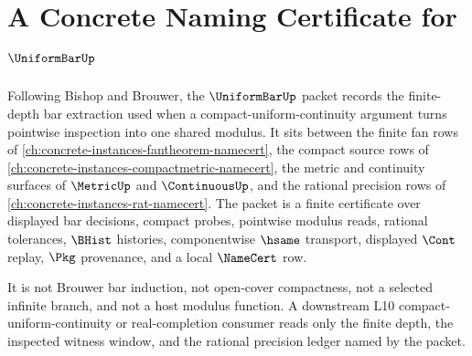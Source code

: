 \chapter{A Concrete Naming Certificate for $\UniformBarUp$}
\label{ch:concrete-instances-uniform-bar-namecert}

Following Bishop and Brouwer, the $\UniformBarUp$ packet records the finite-depth bar extraction used when a compact-uniform-continuity argument turns pointwise inspection into one shared modulus. It sits between the finite fan rows of \autoref{ch:concrete-instances-fantheorem-namecert}, the compact source rows of \autoref{ch:concrete-instances-compactmetric-namecert}, the metric and continuity surfaces of $\MetricUp$ and $\ContinuousUp$, and the rational precision rows of \autoref{ch:concrete-instances-rat-namecert}. The packet is a finite certificate over displayed bar decisions, compact probes, pointwise modulus reads, rational tolerances, $\BHist$ histories, componentwise $\hsame$ transport, displayed $\Cont$ replay, $\Pkg$ provenance, and a local $\NameCert$ row.

It is not Brouwer bar induction, not open-cover compactness, not a selected infinite branch, and not a host modulus function. A downstream L10 compact-uniform-continuity or real-completion consumer reads only the finite depth, the inspected witness window, and the rational precision ledger named by the packet.

